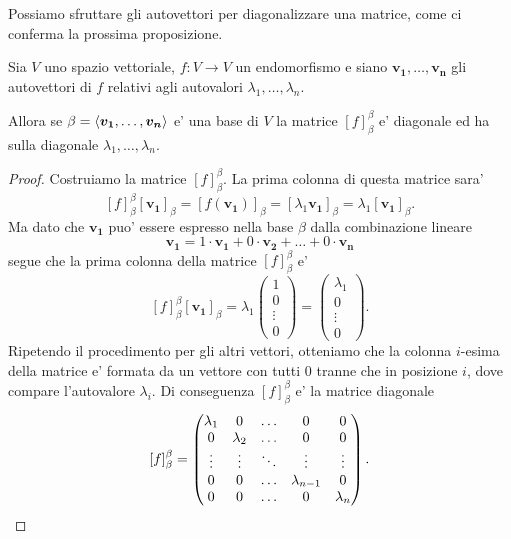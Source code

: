 Possiamo sfruttare gli autovettori per diagonalizzare una matrice, come ci conferma la prossima proposizione.

\begin{proposition}
    Sia $V$ uno spazio vettoriale, $f: V \to V$ un endomorfismo e siano $\bm{v_1}, \dots, \bm{v_n}$ gli autovettori di $f$ relativi agli autovalori $\lambda_1, \dots, \lambda_n$. 
    
    Allora se $\beta = \left\langle \bm{v_1}, \dots, \bm{v_n} \right\rangle$ e' una base di $V$ la matrice $[f]_{\beta}^{\beta}$ e' diagonale ed ha sulla diagonale $\lambda_1, \dots, \lambda_n$.
\end{proposition}
\begin{proof}
    Costruiamo la matrice $[f]_{\beta}^{\beta}$. La prima colonna di questa matrice sara' \[
        [f]_{\beta}^{\beta}[\bm{v_1}]_{\beta} = [f(\bm{v_1})]_{\beta} = [\lambda_1 \bm{v_1}]_{\beta} = \lambda_1 [\bm{v_1}]_{\beta}.
    \]
    Ma dato che $\bm{v_1}$ puo' essere espresso nella base $\beta$ dalla combinazione lineare \[
        \bm{v_1} = 1\cdot \bm{v_1} + 0 \cdot \bm{v_2} + \dots + 0 \cdot \bm{v_n}    
    \]
    segue che la prima colonna della matrice $[f]_{\beta}^{\beta}$ e' \[
        [f]_{\beta}^{\beta}[\bm{v_1}]_{\beta} = \lambda_1 \begin{pmatrix} 1 \\ 0 \\ \vdots \\ 0 \end{pmatrix} = \begin{pmatrix} \lambda_1 \\ 0 \\ \vdots \\ 0 \end{pmatrix}.
    \]
    Ripetendo il procedimento per gli altri vettori, otteniamo che la colonna $i$-esima della matrice e' formata da un vettore con tutti $0$ tranne che in posizione $i$, dove compare l'autovalore $\lambda_i$. Di conseguenza $[f]_{\beta}^{\beta}$ e' la matrice diagonale\[
        [f]_{\beta}^{\beta} = \begin{pmatrix}
            \lambda_1   & 0         & \dots  & 0             & 0 \\
            0           & \lambda_2 & \dots  & 0             & 0 \\
            \vdots      & \vdots    & \ddots & \vdots        & \vdots \\
            0           & 0         & \dots  & \lambda_{n-1} & 0 \\
            0           & 0         & \dots  & 0             & \lambda_n \\
        \end{pmatrix}. \qedhere
    \]
\end{proof}

